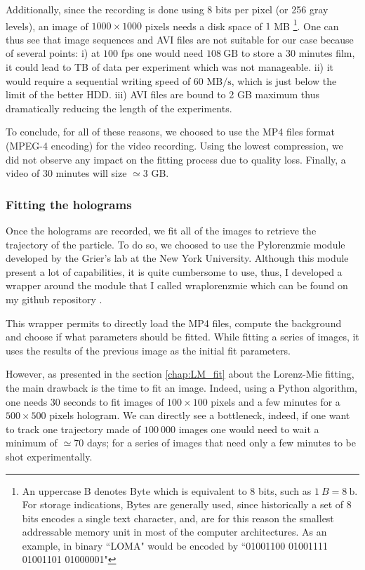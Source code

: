 Additionally, since the recording is done using 8 bits per pixel (or 256 gray levels), an image of $1000 \times 1000$ pixels needs a disk space of $1$ MB \footnote{An uppercase B denotes Byte which is equivalent to 8 bits, such as $1\mathrm ~ {B} = 8 ~ \mathrm{b}$. For storage indications, Bytes are generally used, since historically a set of $8$ bits encodes a single text character, and, are for this reason the smallest addressable memory unit in most of the computer architectures. As an example, in binary ``LOMA" would be encoded by ``01001100 01001111 01001101 01000001" }. One can thus see that image sequences and AVI files are not suitable for our case because of several points: i) at $100$ \gls{fps} one would need $108 ~ \mathrm{GB}$ to store a 30 minutes film, it could lead to TB of data per experiment which was not manageable. ii) it would require a sequential writing speed of 60 $\mathrm{MB/s}$, which is just below the limit of the better HDD. iii) AVI files are bound to 2 GB maximum thus dramatically reducing the length of the experiments.

To conclude, for all of these reasons, we choosed to use the MP4 files format (MPEG-4 encoding) for the video recording. Using the lowest compression, we did not observe any impact on the fitting process due to quality loss. Finally, a video of 30 minutes will size $\simeq 3$ GB.


\subsubsection{Fitting the holograms}


Once the holograms are recorded, we fit all of the images to retrieve the trajectory of the particle. To do so, we choosed to use the Pylorenzmie module developed by the Grier's lab at the New York University. Although this module present a lot of capabilities, it is quite cumbersome to use, thus, I developed a wrapper around the module that I called wraplorenzmie which can be found on my github repository \href{https://github.com/eXpensia/wraplorenzmie}{\faGithub}. 

This wrapper permits to directly load the MP4 files, compute the background and choose if what parameters should be fitted. While fitting a series of images, it uses the results of the previous image as the initial fit parameters.

However, as presented in the section \ref{chap:LM_fit} about the Lorenz-Mie fitting, the main drawback is the time to fit an image. Indeed, using a Python algorithm, one needs $30$ seconds to fit images of $100 \times  100$ pixels and a few minutes for a $500\times 500$ pixels hologram. We can directly see a bottleneck, indeed, if one want to track one trajectory made of $100~000$ images one would need to wait a minimum of $\simeq 70$ days; for a series of images that need only a few minutes to be shot experimentally. 


